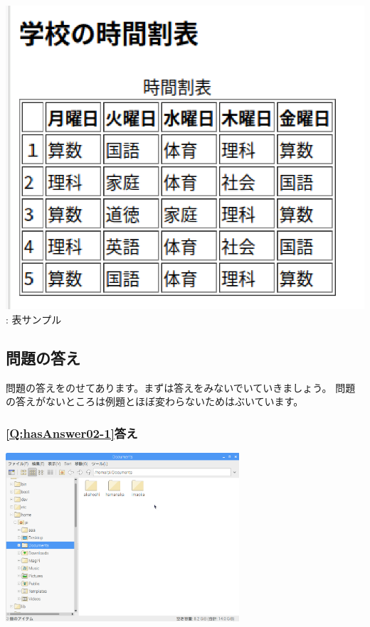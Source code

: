 \documentclass[a4paper,12pt]{jarticle}
\begin{document}
\begin{minipage}{0.4\textwidth}
  {\upshape
    \includegraphics[width=\linewidth]{textbook-img211.png}
    \newline
    {\theFigure\label{seq:refFigure45}}:
    表サンプル}
\end{minipage}

\bigskip

\flushleft
\clearpage\subsection{\bfseries
  問題の答え}

問題の答えをのせてあります。まずは答えをみないでいていきましょう。\newline
問題の答えがないところは例題とほぼ変わらないためはぶいています。

\subsubsection{\bfseries
  \ref*{Q:hasAnswer02-1}答え}

\bigskip


\centering
\includegraphics[width=0.65\textwidth]{textbook-img212.png}
\flushleft
\end{document}
